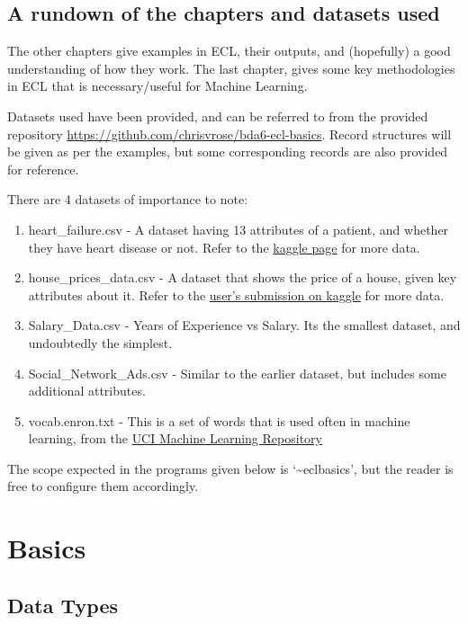 \documentclass[a4paper,oneside,12pt]{book}
\begin{document}
\section[Chapter information and Datasets]{A rundown of the chapters and datasets used}

The other chapters give examples in ECL, their outputs, and (hopefully) a good understanding of how they work. The last chapter, gives some key methodologies in ECL that is necessary/useful for Machine Learning.

Datasets used have been provided, and can be referred to from the provided repository \url{https://github.com/chrisvrose/bda6-ecl-basics}. Record structures will be given as per the examples, but some corresponding records are also provided for reference.

There are 4 datasets of importance to note:
\begin{enumerate}
    \item heart\_failure.csv - A dataset having 13 attributes of a patient, and whether they have heart disease or not. Refer to the \href{https://www.kaggle.com/ronitf/heart-disease-uci}{kaggle page} for more data. 
    \item house\_prices\_data.csv - A dataset that shows the price of a house, given key attributes about it. Refer to the \href{https://www.kaggle.com/shivachandel/kc-house-data}{user's submission on kaggle} for more data.
    \item Salary\_Data.csv - Years of Experience vs Salary. Its the smallest dataset, and undoubtedly the simplest.
    \item Social\_Network\_Ads.csv - Similar to the earlier dataset, but includes some additional attributes.
    \item vocab.enron.txt - This is a set of words that is used often in machine learning, from the \href{https://archive.ics.uci.edu/ml/datasets/Bag+of+Words}{UCI Machine Learning Repository}
\end{enumerate}

The scope expected in the programs given below is `\~{}eclbasics', but the reader is free to configure them accordingly.

\chapter{Basics}

\section{Data Types}
\end{document}
